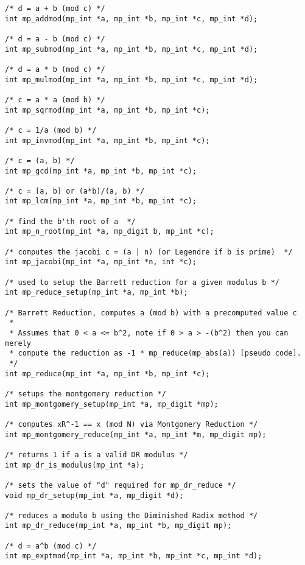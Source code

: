 \documentclass{article}
\begin{document}
\begin{verbatim}
/* d = a + b (mod c) */
int mp_addmod(mp_int *a, mp_int *b, mp_int *c, mp_int *d);

/* d = a - b (mod c) */
int mp_submod(mp_int *a, mp_int *b, mp_int *c, mp_int *d);

/* d = a * b (mod c) */
int mp_mulmod(mp_int *a, mp_int *b, mp_int *c, mp_int *d);

/* c = a * a (mod b) */
int mp_sqrmod(mp_int *a, mp_int *b, mp_int *c);

/* c = 1/a (mod b) */
int mp_invmod(mp_int *a, mp_int *b, mp_int *c);

/* c = (a, b) */
int mp_gcd(mp_int *a, mp_int *b, mp_int *c);

/* c = [a, b] or (a*b)/(a, b) */
int mp_lcm(mp_int *a, mp_int *b, mp_int *c);

/* find the b'th root of a  */
int mp_n_root(mp_int *a, mp_digit b, mp_int *c);

/* computes the jacobi c = (a | n) (or Legendre if b is prime)  */
int mp_jacobi(mp_int *a, mp_int *n, int *c);

/* used to setup the Barrett reduction for a given modulus b */
int mp_reduce_setup(mp_int *a, mp_int *b);

/* Barrett Reduction, computes a (mod b) with a precomputed value c  
 *
 * Assumes that 0 < a <= b^2, note if 0 > a > -(b^2) then you can merely
 * compute the reduction as -1 * mp_reduce(mp_abs(a)) [pseudo code].
 */
int mp_reduce(mp_int *a, mp_int *b, mp_int *c);

/* setups the montgomery reduction */
int mp_montgomery_setup(mp_int *a, mp_digit *mp);

/* computes xR^-1 == x (mod N) via Montgomery Reduction */
int mp_montgomery_reduce(mp_int *a, mp_int *m, mp_digit mp);

/* returns 1 if a is a valid DR modulus */
int mp_dr_is_modulus(mp_int *a);

/* sets the value of "d" required for mp_dr_reduce */
void mp_dr_setup(mp_int *a, mp_digit *d);

/* reduces a modulo b using the Diminished Radix method */
int mp_dr_reduce(mp_int *a, mp_int *b, mp_digit mp);

/* d = a^b (mod c) */
int mp_exptmod(mp_int *a, mp_int *b, mp_int *c, mp_int *d);
\end{verbatim}
\end{document}
